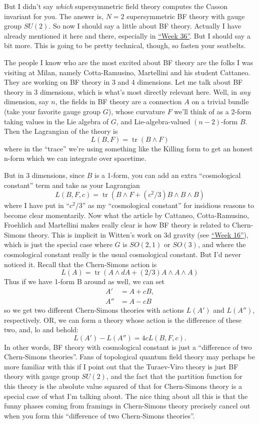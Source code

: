 \documentclass{article}
\begin{document}
But I didn't say \emph{which} supersymmetric field theory computes the
Casson invariant for you. The answer is, \(N = 2\) supersymmetric BF
theory with gauge group \(SU(2)\). So now I should say a little about BF
theory. Actually I have already mentioned it here and there, especially
in \protect\hyperlink{week36}{``Week 36''}. But I should say a bit more.
This is going to be pretty technical, though, so fasten your seatbelts.

The people I know who are the most excited about BF theory are the folks
I was visiting at Milan, namely Cotta-Ramusino, Martellini and his
student Cattaneo. They are working on BF theory in 3 and 4 dimensions.
Let me talk about BF theory in 3 dimensions, which is what's most
directly relevant here. Well, in \emph{any} dimension, say \(n\), the
fields in BF theory are a connection \(A\) on a trivial bundle (take
your favorite gauge group \(G\)), whose curvature \(F\) we'll think of
as a 2-form taking values in the Lie algebra of \(G\), and
Lie-algebra-valued \((n-2)\)-form \(B\). Then the Lagrangian of the
theory is \[L(B,F) = \operatorname{tr}(B \wedge F)\] where in the
``trace'' we're using something like the Killing form to get an honest
n-form which we can integrate over spacetime.

But in 3 dimensions, since \(B\) is a 1-form, you can add an extra
``cosmological constant'' term and take as your Lagrangian
\[L(B,F,c) = \operatorname{tr}(B \wedge F + (c^2/3) B \wedge B \wedge B)\]
where I have put in ``\(c^2/3\)'' as my ``cosmological constant'' for
insidious reasons to become clear momentarily. Now what the article by
Cattaneo, Cotta-Ramusino, Froehlich and Martellini makes really clear is
how BF theory is related to Chern-Simons theory. This is implicit in
Witten's work on 3d gravity (see \protect\hyperlink{week16}{``Week
16''}), which is just the special case where \(G\) is \(SO(2,1)\) or
\(SO(3)\), and where the cosmological constant really is the usual
cosmological constant. But I'd never noticed it. Recall that the
Chern-Simons action is
\[L(A) = \operatorname{tr}(A \wedge dA + (2/3)A \wedge A \wedge A)\]
Thus if we have 1-form B around as well, we can set \[
  \begin{aligned}
    A' &= A + cB,
  \\A'' &= A - cB
  \end{aligned}
\] so we get two different Chern-Simons theories with actions \(L(A')\)
and \(L(A'')\), respectively. OR, we can form a theory whose action is
the difference of these two, and, lo and behold:
\[L(A') - L(A'') = 4cL(B,F,c).\] In other words, BF theory with
cosmological constant is just a ``difference of two Chern-Simons
theories''. Fans of topological quantum field theory may perhaps be more
familiar with this if I point out that the Turaev-Viro theory is just BF
theory with gauge group \(SU(2)\), and the fact that the partition
function for this theory is the absolute value squared of that for
Chern-Simons theory is a special case of what I'm talking about. The
nice thing about all this is that the funny phases coming from framings
in Chern-Simons theory precisely cancel out when you form this
``difference of two Chern-Simons theories''.
\end{document}
